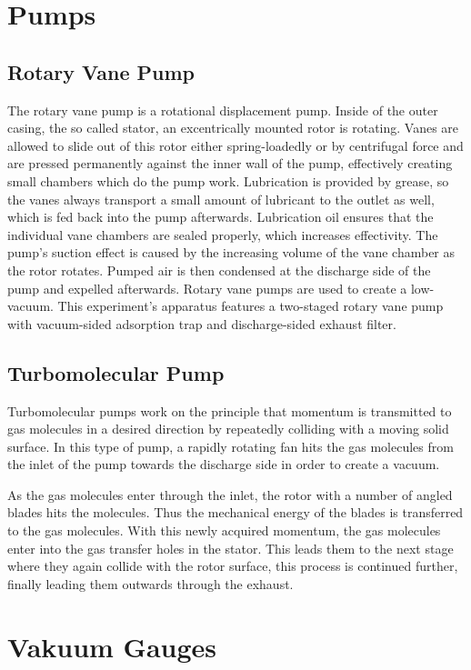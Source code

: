 
\section{Pumps}
\subsection{Rotary Vane Pump}
The rotary vane pump is a rotational displacement pump.
Inside of the outer casing, the so called stator, an excentrically mounted rotor is rotating.
Vanes are allowed to slide out of this rotor either spring-loadedly or by centrifugal force and are pressed permanently against the inner wall of the pump, effectively creating small chambers which do the pump work.
Lubrication is provided by grease, so the vanes always transport a small amount of lubricant to the outlet as well, which is fed back into the pump afterwards.
Lubrication oil ensures that the individual vane chambers are sealed properly, which increases effectivity.
The pump's suction effect is caused by the increasing volume of the vane chamber as the rotor rotates.
Pumped air is then condensed at the discharge side of the pump and expelled afterwards.
Rotary vane pumps are used to create a low-vacuum.
This experiment's apparatus features a two-staged rotary vane pump with vacuum-sided adsorption trap and discharge-sided exhaust filter.

\subsection{Turbomolecular Pump}
Turbomolecular pumps work on the principle that momentum is transmitted to gas molecules in a desired direction by repeatedly colliding with a moving solid surface.
In this type of pump, a rapidly rotating fan hits the gas molecules from the inlet of the pump towards the discharge side in order to create a vacuum.

As the gas molecules enter through the inlet, the rotor with a number of angled blades hits the molecules.
Thus the mechanical energy of the blades is transferred to the gas molecules.
With this newly acquired momentum, the gas molecules enter into the gas transfer holes in the stator.
This leads them to the next stage where they again collide with the rotor surface, this process is continued further, finally leading them outwards through the exhaust.

\section{Vakuum Gauges}
